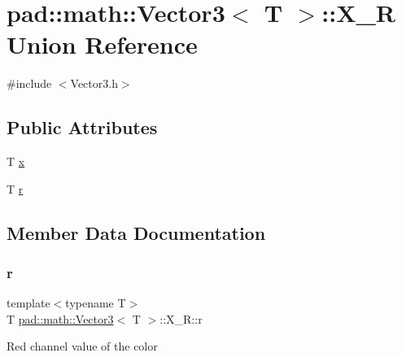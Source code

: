 \hypertarget{unionpad_1_1math_1_1_vector3_1_1_x___r}{}\section{pad\+:\+:math\+:\+:Vector3$<$ T $>$\+:\+:X\+\_\+R Union Reference}
\label{unionpad_1_1math_1_1_vector3_1_1_x___r}


{\ttfamily \#include $<$Vector3.\+h$>$}

\subsection*{Public Attributes}
\begin{DoxyCompactItemize}
\item 
T \mbox{\hyperlink{unionpad_1_1math_1_1_vector3_1_1_x___r_abe6029cdd0fafd55910e12d490fed227}{x}}
\item 
T \mbox{\hyperlink{unionpad_1_1math_1_1_vector3_1_1_x___r_a740dfefaeb0a233661b05c7e2b91270e}{r}}
\end{DoxyCompactItemize}


\subsection{Member Data Documentation}
\mbox{\label{unionpad_1_1math_1_1_vector3_1_1_x___r_a740dfefaeb0a233661b05c7e2b91270e}} 
\subsubsection{\texorpdfstring{r}{r}}
{\footnotesize\ttfamily template$<$typename T$>$ \\
T \mbox{\hyperlink{structpad_1_1math_1_1_vector3}{pad\+::math\+::\+Vector3}}$<$ T $>$\+::X\+\_\+\+R\+::r}

Red channel value of the color \mbox{\label{unionpad_1_1math_1_1_vector3_1_1_x___r_abe6029cdd0fafd55910e12d490fed227}} 
